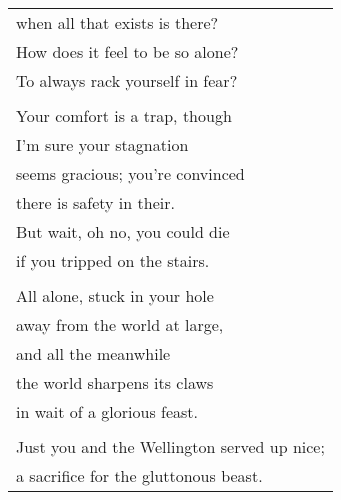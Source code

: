 \documentclass[empty]{article}
\begin{document}
\begin{center}
\begin{tabular}{l}
when all that exists is there? \\
How does it feel to be so alone? \\
To always rack yourself in fear? \\
\\
Your comfort is a trap, though \\
I'm sure your stagnation \\
seems gracious; you're convinced \\
there is safety in their. \\
But wait, oh no, you could die \\
if you tripped on the stairs. \\
\\
All alone, stuck in your hole \\
away from the world at large, \\
and all the meanwhile \\
the world sharpens its claws \\
in wait of a glorious feast. \\
\\
Just you and the Wellington served up nice; \\
a sacrifice for the gluttonous beast. \\
\end{tabular}
\end{center}
\end{document}
